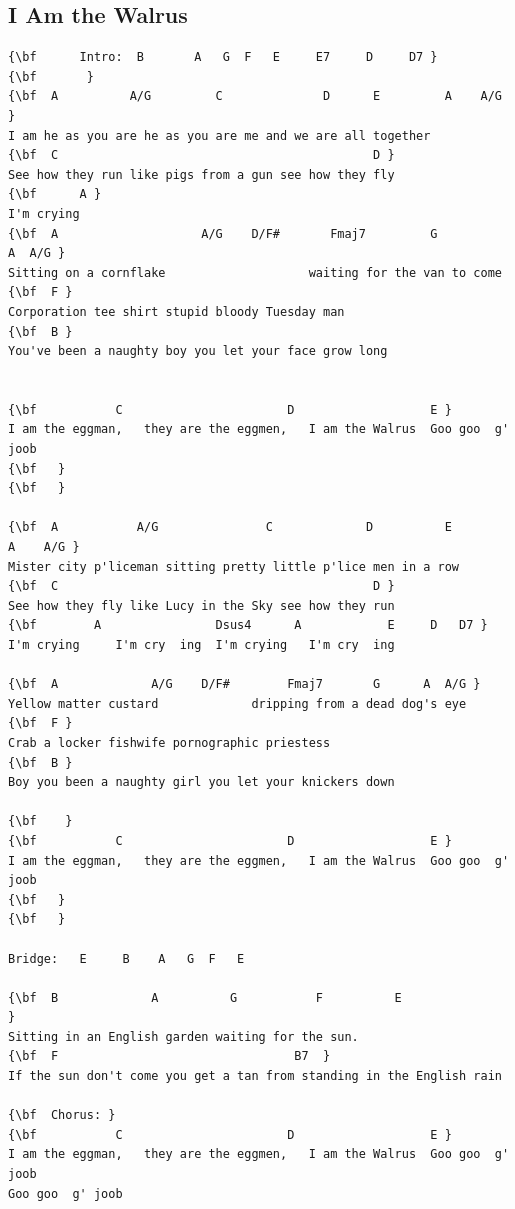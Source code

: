 \documentclass[a4paper]{article}
\begin{document}
\subsection{I Am the Walrus}
\begin{Verbatim}[commandchars=\\\{\}]
{\bf      Intro:  B       A   G  F   E     E7     D     D7 }
{\bf       }
{\bf  A          A/G         C              D      E         A    A/G }
I am he as you are he as you are me and we are all together 
{\bf  C                                            D }
See how they run like pigs from a gun see how they fly 
{\bf      A }
I'm crying 
{\bf  A                    A/G    D/F#       Fmaj7         G          A  A/G }
Sitting on a cornflake                    waiting for the van to come 
{\bf  F }
Corporation tee shirt stupid bloody Tuesday man 
{\bf  B }
You've been a naughty boy you let your face grow long 


{\bf           C                       D                   E }
I am the eggman,   they are the eggmen,   I am the Walrus  Goo goo  g' joob
{\bf  ￼}
{\bf   }

{\bf  A           A/G               C             D          E        A    A/G }
Mister city p'liceman sitting pretty little p'lice men in a row 
{\bf  C                                            D }
See how they fly like Lucy in the Sky see how they run 
{\bf        A                Dsus4      A            E     D   D7 }
I'm crying     I'm cry  ing  I'm crying   I'm cry  ing 

{\bf  A             A/G    D/F#        Fmaj7       G      A  A/G }
Yellow matter custard             dripping from a dead dog's eye 
{\bf  F }
Crab a locker fishwife pornographic priestess  
{\bf  B }
Boy you been a naughty girl you let your knickers down 

{\bf  ￼￼}
{\bf           C                       D                   E }
I am the eggman,   they are the eggmen,   I am the Walrus  Goo goo  g' joob
{\bf  ￼}
{\bf   }

Bridge:   E     B    A   G  F   E 

{\bf  B             A          G           F          E                }
Sitting in an English garden waiting for the sun.        
{\bf  F                                 B7  }
If the sun don't come you get a tan from standing in the English rain   

{\bf  Chorus: }
{\bf           C                       D                   E }
I am the eggman,   they are the eggmen,   I am the Walrus  Goo goo  g' joob  
Goo goo  g' joob            


\end{Verbatim}
\end{document}
